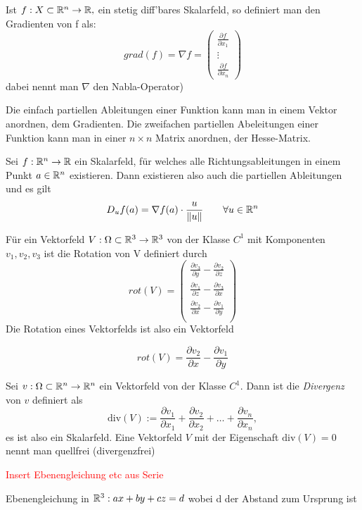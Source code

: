 \begin{definition}[Gradient]
	Ist $f: X \subset \mathbb{R}^n \to \mathbb{R}, $ ein stetig diff'bares Skalarfeld, so definiert man den Gradienten von f als:
	$$grad(f) = \nabla f = \begin{pmatrix} \frac{\partial f}{\partial x_1} \\ \vdots \\ \frac{\partial f}{\partial x_n} \end{pmatrix}$$
	dabei nennt man $\nabla$ den Nabla-Operator)
\end{definition}

\begin{remark}
    Die einfach partiellen Ableitungen einer Funktion kann man in einem Vektor anordnen, dem Gradienten.
    Die zweifachen partiellen Abeleitungen einer Funktion kann man in einer $n \times n$ Matrix anordnen, der Hesse-Matrix.
\end{remark}

\begin{theorem}
    Sei $f:\mathbb{R}^n \to \mathbb{R}$ ein Skalarfeld, für welches alle Richtungsableitungen in einem Punkt $a \in \mathbb{R}^n$ existieren. Dann existieren also auch die partiellen Ableitungen und es gilt
    $$ D_u f(a) = \nabla f(a) \cdot \frac{u}{\lVert u\rVert} \quad \quad \forall u \in \mathbb{R}^n $$
\end{theorem}

\begin{definition}[Rotation]
    Für ein Vektorfeld $V: \Omega \subset \mathbb{R}^3 \to \mathbb{R}^3$ von der Klasse $C^1$ mit Komponenten $v_1, v_2, v_3$ ist die Rotation von V definiert durch 
    $$rot(V) = \begin{pmatrix} \frac{\partial v_3}{\partial y} - \frac{\partial v_2}{\partial z} \\
    \frac{\partial v_1}{\partial z} - \frac{\partial v_3}{\partial x} \\
    \frac{\partial v_2}{\partial x} - \frac{\partial v_1}{\partial y} \\
    \end{pmatrix}$$
    Die Rotation eines Vektorfelds ist also ein Vektorfeld
\end{definition}

\begin{remark}[Rotation in $\R^2$]
    $$rot(V) = \frac{\partial v_2}{\partial x} - \frac{\partial v_1}{\partial y} $$
\end{remark}

\begin{definition}[Divergenz]
    Sei $v: \Omega \subset \mathbb{R}^n \to \mathbb{R}^n$ ein Vektorfeld von der Klasse $C^1$. Dann ist die \textit{Divergenz} von $v$ definiert als 
    $$ \mathrm{div}(V) := \frac{\partial v_1}{\partial x_1} + \frac{\partial v_2}{\partial x_2} + \dots + \frac{\partial v_n}{\partial x_n},$$
    es ist also ein Skalarfeld. Eine Vektorfeld $V$ mit der Eigenschaft $\mathrm{div}(V) = 0$ nennt man quellfrei (divergenzfrei)
\end{definition}

\begin{remark}
    \textcolor{red}{Insert Ebenengleichung etc aus Serie}
\end{remark}

\begin{remark}
    Ebenengleichung in $\mathbb{R}^3: ax + by + cz = d $ wobei d der Abstand zum Ursprung ist \\
    
\end{remark}